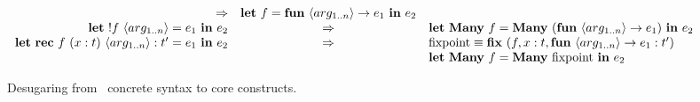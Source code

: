 \begin{figure}[t]
\begin{center}
\[\begin{array}{rcl}
    \Rightarrow &
    \mathbf{let}\ f = \mathbf{fun}\ {\langle arg_{1 .. n} \rangle} \rightarrow e_1\
    \mathbf{in}\ e_2
\\
    \mathbf{let}\ !f\ {\langle arg_{1 .. n} \rangle} = e_1\ \mathbf{in}\ e_2 &
    \Rightarrow &
    \mathbf{let\ Many}\ f = \mathbf{Many}\ (\mathbf{fun}\ {\langle arg_{1 .. n} \rangle}
    \rightarrow e_1)\ \mathbf{in}\ e_2
\\
    \mathbf{let\ rec}\ f\ (x : t)\ {\langle arg_{1 .. n} \rangle} : {t'} = e_1\ \mathbf{in}\ e_2 &
    \Rightarrow &
    \specialcell[t]{l}{\mathrm{fixpoint} \equiv \mathbf{fix}\ (f, x : t,
        \mathbf{fun}\ {\langle arg_{1 .. n} \rangle} \rightarrow e_1 : {t'} ) \\
    \mathbf{let\ Many}\ f = \mathbf{Many}\ \mathrm{fixpoint}\ \mathbf{in}\ e_2}
    \end{array}
\]
\end{center}
\caption{Desugaring from \lang\ concrete syntax to core constructs.}\label{fig:lang_desugar}
\end{figure}

